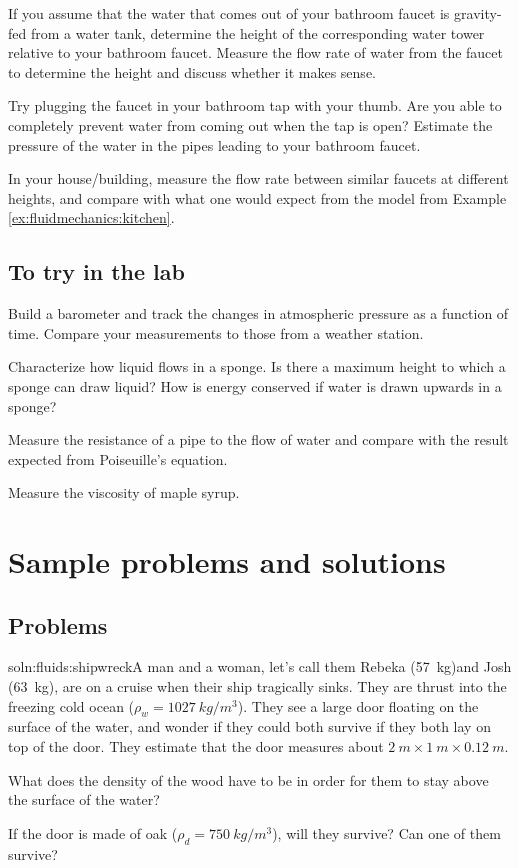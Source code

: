 {{If you assume that the water that comes out of your bathroom faucet is gravity-fed from a water tank, determine the height of the corresponding water tower relative to your bathroom faucet. Measure the flow rate of water from the faucet to determine the height and discuss whether it makes sense. 

Try plugging the faucet in your bathroom tap with your thumb. Are you able to completely prevent water from coming out when the tap is open? Estimate the pressure of the water in the pipes leading to your bathroom faucet.

In your house/building, measure the flow rate between similar faucets at different heights, and compare with what one would expect from the model from Example \ref{ex:fluidmechanics:kitchen}.

\subsection{To try in the lab}
Build a barometer and track the changes in atmospheric pressure as a function of time. Compare your measurements to those from a weather station. 

Characterize how liquid flows in a sponge. Is there a maximum height to which a sponge can draw liquid? How is energy conserved if water is drawn upwards in a sponge?

Measure the resistance of a pipe to the flow of water and compare with the result expected from Poiseuille's equation.

Measure the viscosity of maple syrup.
\newpage
\section{Sample problems and solutions}
\subsection{Problems}
\begin{problemParts}{soln:fluids:shipwreck}{\label{prob:fluids:shipwreck}A man and a woman, let's call them Rebeka (\SI{57}{kg})and Josh (\SI{63}{kg}), are on a cruise when their ship tragically sinks. They are thrust into the freezing cold ocean ($\rho_w=\SI{1027}{kg/m^3}$). They see a large door floating on the surface of the water, and wonder if they could both survive if they both lay on top of the door. They estimate that the door measures about $\SI{2}{m}\times\SI{1}{m}\times\SI{0.12}{m}$.}
\item What does the density of the wood have to be in order for them to stay above the surface of the water? 
\item If the door is made of oak ($\rho_d=\SI{750}{kg/m^3}$), will they survive? Can one of them survive?
\end{problemParts}

}}
